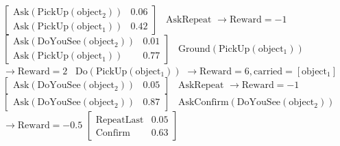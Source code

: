 \begin{Transcript}[p!] 
\vspace{3mm}
\begin{normalsize}
$\phantom{a}$\hspace{13mm}
\begin{dialogue} 
 $\begin{bmatrix}\mathrm{Ask(PickUp(object_2))} & 0.06 \\
\mathrm{Ask(PickUp(object_1))}  & 0.42 \end{bmatrix}$ \vspace{3mm}
 \ $\mathrm{AskRepeat}$ \hspace{47mm} $\rightarrow \mathrm{Reward} = -1$ \vspace{3mm}
 $\begin{bmatrix}\mathrm{Ask(DoYouSee(object_2))}  & 0.01 \\ 
\mathrm{Ask(PickUp(object_1))} & 0.77 \end{bmatrix}$ \vspace{3mm}
 \ $\mathrm{Ground(PickUp(object_1))}$ \hspace{21mm} $\rightarrow \mathrm{Reward} = 2$ \vspace{3mm}
 \ $\mathrm{Do(PickUp(object_1))}$ \hspace{29mm} $\rightarrow \mathrm{Reward} = 6, \mathrm{carried} = [\mathrm{object_1}]$ \vspace{3mm}
 $\begin{bmatrix}\mathrm{Ask(DoYouSee(object_2))} & 0.05 \end{bmatrix}$ \vspace{3mm}
 \ $\mathrm{AskRepeat}$ \hspace{47mm} $\rightarrow \mathrm{Reward} = -1$ \vspace{3mm}
 $\begin{bmatrix} \mathrm{Ask(DoYouSee(object_2))}  & 0.87 \end{bmatrix}$ \vspace{3mm}
 \ $\mathrm{AskConfirm(DoYouSee(object_2))}$ \hspace{7mm} $\rightarrow \mathrm{Reward} = -0.5$ \vspace{3mm}
 $\begin{bmatrix}\mathrm{RepeatLast} & 0.05 \\ \mathrm{Confirm} & 0.63 \end{bmatrix}$ \vspace{3mm}

\end{dialogue}
\end{normalsize}
\end{Transcript}
